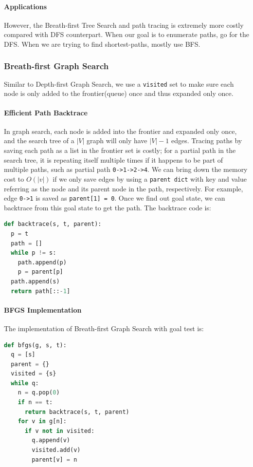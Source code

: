 \documentclass[main.tex]{subfiles}
\begin{document}
\paragraph{Applications} However, the Breath-first Tree Search and path tracing is extremely more costly compared with DFS counterpart. When our goal is to enumerate paths, go for the DFS. When we are trying to find shortest-paths, mostly use BFS. 

\subsubsection{Breath-first Graph Search}
Similar to Depth-first Graph Search, we use a \texttt{visited} set to make sure each node is only added to the frontier(queue) once and thus expanded only once. 

\paragraph{Efficient Path Backtrace} In graph search, each node is added into the frontier and expanded only once, and the search tree of a $|V|$ graph will only have $|V|-1$ edges. Tracing paths by saving each path as a list in the frontier set is costly; for a partial path in the search tree, it is repeating itself multiple times if it happens to be part of multiple paths, such as partial path \texttt{0->1->2->4}. We can bring down the memory cost to $O(|v|)$ if we only save edges by using a \texttt{parent dict} with key and value referring as the node and its parent node in the path, respectively. For example, edge \texttt{0->1} is saved as \texttt{parent[1] = 0}. Once we find out goal state, we can backtrace from this goal state to get the path. The backtrace code is:
\begin{lstlisting}[language=Python]
def backtrace(s, t, parent):
  p = t
  path = []
  while p != s:
    path.append(p)
    p = parent[p]
  path.append(s)
  return path[::-1]
\end{lstlisting}
\paragraph{BFGS Implementation} The implementation of Breath-first Graph Search with goal test is:
\begin{lstlisting}[language=Python]
def bfgs(g, s, t):
  q = [s]
  parent = {}
  visited = {s}
  while q:
    n = q.pop(0)
    if n == t:
      return backtrace(s, t, parent)
    for v in g[n]:
      if v not in visited:
        q.append(v)
        visited.add(v)
        parent[v] = n
\end{lstlisting}
\end{document}
